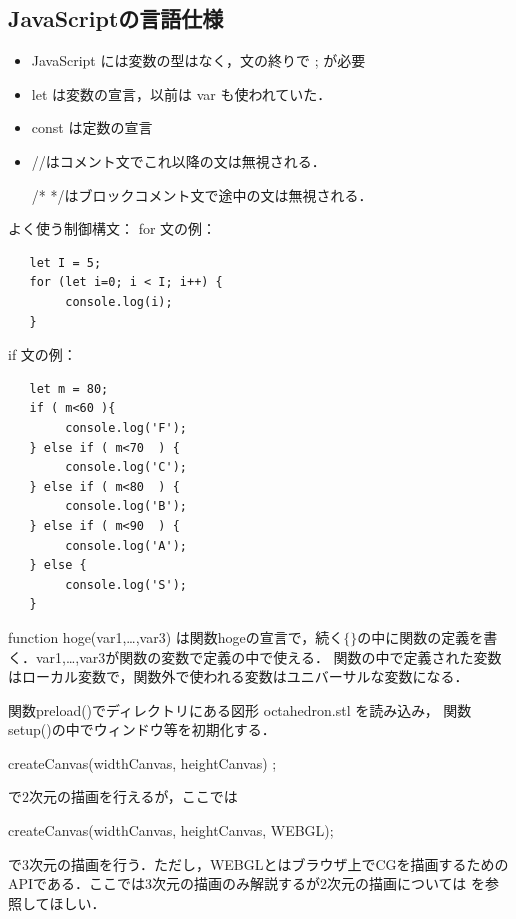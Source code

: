 \subsection{JavaScriptの言語仕様}
\begin{itemize}
\item
JavaScript には変数の型はなく，文の終りで ; が必要

\item
let は変数の宣言，以前は var も使われていた．

\item
const は定数の宣言

\item
\verb////はコメント文でこれ以降の文は無視される．

\noindent
/* */はブロックコメント文で途中の文は無視される．
\end{itemize}


よく使う制御構文：
for 文の例：
\begin{verbatim}
   let I = 5;
   for (let i=0; i < I; i++) {
        console.log(i);
   }

\end{verbatim}

if 文の例：
\begin{verbatim}
   let m = 80;
   if ( m<60 ){
        console.log('F');
   } else if ( m<70  ) {
        console.log('C');
   } else if ( m<80  ) {
        console.log('B');
   } else if ( m<90  ) {
        console.log('A');
   } else {
        console.log('S');
   }

\end{verbatim}


function hoge(var1,\dots,var3) は関数hogeの宣言で，続く$\{ \}$の中に関数の定義を書く．var1,\dots,var3が関数の変数で定義の中で使える．
関数の中で定義された変数はローカル変数で，関数外で使われる変数はユニバーサルな変数になる．


関数preload()でディレクトリにある図形 octahedron.stl を読み込み，
関数setup()の中でウィンドウ等を初期化する．

   createCanvas(widthCanvas, heightCanvas) ;

\noindent
で$2$次元の描画を行えるが，ここでは

   createCanvas(widthCanvas, heightCanvas, WEBGL);

\noindent
で$3$次元の描画を行う．ただし，WEBGLとはブラウザ上でCGを描画するためのAPIである．ここでは$3$次元の描画のみ解説するが$2$次元の描画については\cite{P5} を参照してほしい．

